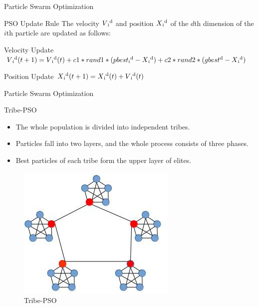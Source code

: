 \documentclass[table]{beamer}
\begin{document}
	\begin{frame}{Particle Swarm Optimization}
		\begin{block}{PSO Update Rule}
			The velocity $V\textsubscript{i}\textsuperscript{d}$ and position $X\textsubscript{i}\textsuperscript{d}$ of the $d$th dimension of the $i$th particle are updated as follows:
		\end{block}
		\begin{block}{Velocity Update}
			$V\textsubscript{i}\textsuperscript{d}(t+1) = V\textsubscript{i}\textsuperscript{d}(t) +\newline c1*rand1*(pbest\textsubscript{i}\textsuperscript{d}-X\textsubscript{i}\textsuperscript{d})+c2*rand2*(gbest\textsuperscript{d}-X\textsubscript{i}\textsuperscript{d})$
		\end{block}
		\begin{block}{Position Update}
			$X\textsubscript{i}\textsuperscript{d}(t+1)=X\textsubscript{i}\textsuperscript{d}(t)+V\textsubscript{i}\textsuperscript{d}(t)$
		\end{block}
	\end{frame}

	\begin{frame}{Particle Swarm Optimization}
		\begin{block}{Tribe-PSO}
			\begin{itemize}
				\item The whole population is divided into independent tribes. \cite{chen2006tribe}
				\item Particles fall into two layers, and the whole process consists of three phases.
				\item Best particles of each tribe form the upper layer of elites.
			\end{itemize}
		\end{block}
		\begin{figure}[v]
			\includegraphics[scale=0.6]{tpso}
			\centering
			\caption{Tribe-PSO}
			\label{ref:tpso}
		\end{figure}		
	\end{frame}
	
\end{document}
